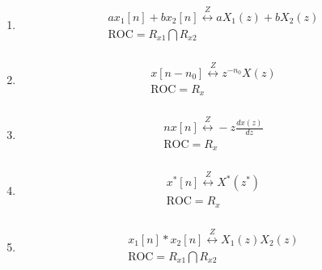 \begin{enumerate}
\item 
\begin{equation}
    \begin{gathered}
        a{x_1}[n] + b{x_2}[n]\overset Z \longleftrightarrow a{X_1}(z) + b{X_2}(z) \\ 
        {\text{ROC}} = {R_{x1}}\bigcap {{R_{x2}}}  \\ 
      \end{gathered} 
\end{equation}

\item 
\begin{equation}
    \begin{gathered}
        x[n - {n_0}]\overset Z \longleftrightarrow {z^{ - {n_0}}}X(z) \\ 
        {\text{ROC}} = {R_x} \\ 
      \end{gathered} 
\end{equation}

\item 
\begin{equation}
\begin{gathered}
    nx[n]\overset Z \longleftrightarrow  - z\frac{{dx(z)}}{{dz}} \\ 
    {\text{ROC}} = {R_x} \\ 
  \end{gathered} 
\end{equation}

\item 
\begin{equation}
    \begin{gathered}
        {x^*}[n]\overset Z \longleftrightarrow {X^*}({z^*}) \\ 
        {\text{ROC}} = {R_x} \\ 
      \end{gathered} 
\end{equation}

\item 
\begin{equation}
    \begin{gathered}
        {x_1}[n] * {x_2}[n]\overset Z \longleftrightarrow {X_1}(z){X_2}(z) \\ 
        {\text{ROC}} = {R_{x1}}\bigcap {{R_{x2}}}  \\ 
      \end{gathered} 
\end{equation}


\end{enumerate}
